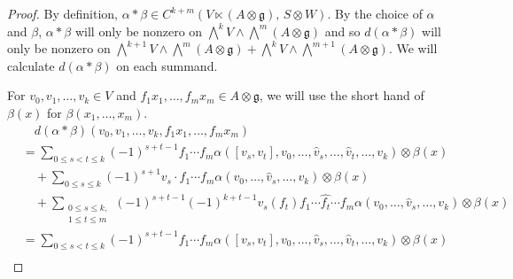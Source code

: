 \documentclass[12pt]{amsart}
\newcommand{\g}{{\mathfrak{g}}}
\theoremstyle{definition}
\begin{document}
\begin{proof}
By definition, $\alpha \ast \beta \in C^{k+m}(V \ltimes (A \otimes \g),\, S \otimes W)$. By the choice of $\alpha$ and $\beta$, $\alpha \ast \beta$ will only be nonzero on $\bigwedge^k V \wedge \bigwedge^m (A \otimes \g)$ and so $d(\alpha \ast \beta)$ will only be nonzero on $\bigwedge^{k+1} V \wedge \bigwedge^m (A \otimes \g) + \bigwedge^k V \wedge \bigwedge^{m+1} (A \otimes \g)$. We will calculate $d(\alpha \ast \beta)$ on each summand. 

For $v_0, v_1, \dots, v_k \in V$ and $f_1 x_1, \dots, f_m  x_m \in A\otimes \g$, we will use the short hand of $\beta(x)$ for $\beta(x_1, \dots, x_m)$.
\begin{align*}
& \quad d (\alpha \ast \beta) (v_0, v_1, \dots, v_k, f_1  x_1, \dots, f_m  x_m) \\
&= \sum_{0 \leq s< t\leq k} (-1)^{s+t-1} f_1 \cdots f_m \alpha ([v_s, v_t] , v_0, \dots, \hat{v}_s, \dots, \hat{v}_t, \dots, v_k) \otimes \beta(x) \\
&\quad+ \sum_{0 \leq s \leq k} (-1)^{s+1} v_s \cdot f_1 \cdots f_m \alpha(v_0, \dots, \hat{v}_s, \dots, v_k)  \otimes \beta(x)\\
&\quad+\sum_{\substack{0 \leq s \leq k, \\ 1 \leq t\leq m}} (-1)^{s+t-1} (-1)^{k+t-1} v_s(f_t) f_1 \cdots \hat{f_t} \cdots f_m \alpha(v_0, \dots, \hat{v}_s, \dots, v_k) \otimes \beta (x) \\
&= \sum_{0 \leq s< t\leq k} (-1)^{s+t-1} f_1 \cdots f_m \alpha ([v_s, v_t] , v_0, \dots, \hat{v}_s, \dots, \hat{v}_t, \dots, v_k) \otimes \beta(x) \\

\end{align*}
\end{proof}
\end{document}
